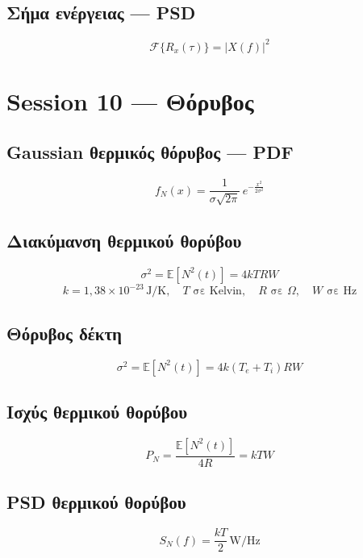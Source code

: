 \documentclass[11pt,a4paper]{article}
\newcommand{\F}{\mathcal{F}}
\newcommand{\E}{\mathbb{E}}
\begin{document}
\subsection{Σήμα ενέργειας — PSD}
\begin{equation}
\F\{R_x(\tau)\} = |X(f)|^2
\end{equation}

\section{Session 10 — Θόρυβος}

\subsection{Gaussian θερμικός θόρυβος — PDF}
\begin{equation}
f_N(x) = \frac{1}{\sigma\sqrt{2\pi}}\,e^{-\frac{x^2}{2\sigma^2}}
\end{equation}

\subsection{Διακύμανση θερμικού θορύβου}
\begin{equation}
\sigma^2 = \E[N^2(t)] = 4kTRW
\end{equation}
\begin{equation}
k = 1{,}38 \times 10^{-23}\,\mathrm{J/K},\quad T\text{ σε Kelvin},\quad R\text{ σε }\Omega,\quad W\text{ σε Hz}
\end{equation}

\subsection{Θόρυβος δέκτη}
\begin{equation}
\sigma^2 = \E[N^2(t)] = 4k(T_e + T_i)RW
\end{equation}

\subsection{Ισχύς θερμικού θορύβου}
\begin{equation}
P_N = \frac{\E[N^2(t)]}{4R} = kTW
\end{equation}

\subsection{PSD θερμικού θορύβου}
\begin{equation}
S_N(f) = \frac{kT}{2}\,\mathrm{W/Hz}
\end{equation}
\end{document}

